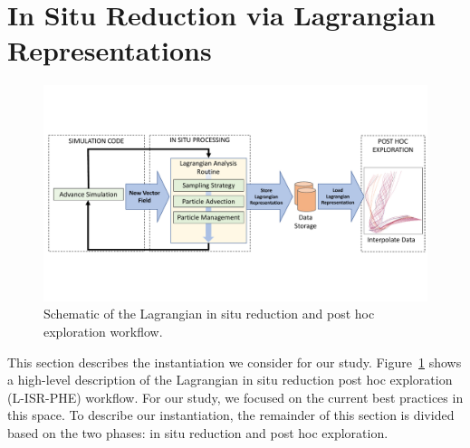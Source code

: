 \documentclass[runningheads]{llncs}
\begin{document}
\section{In Situ Reduction via Lagrangian Representations}
\label{sec:method}
\begin{figure}[!t]
\centering
\includegraphics[width=0.9\linewidth,trim={0cm 4.3cm 0cm 4.3cm}, clip ]{Schematic.pdf}
\vspace{-2mm}
\caption{Schematic of the Lagrangian in situ reduction and post hoc exploration workflow.} %
\vspace{-5mm}
\label{fig:schematic}
\end{figure}

This section describes the instantiation we consider for our study.
%
Figure~\ref{fig:schematic} shows a high-level description of the Lagrangian in situ reduction post hoc exploration (L-ISR-PHE) workflow.
%
%
For our study, we focused on the current best practices in this space.
%
To describe our instantiation, the remainder of this section is divided based on the two phases: in situ reduction and post hoc exploration.
%
\end{document}
